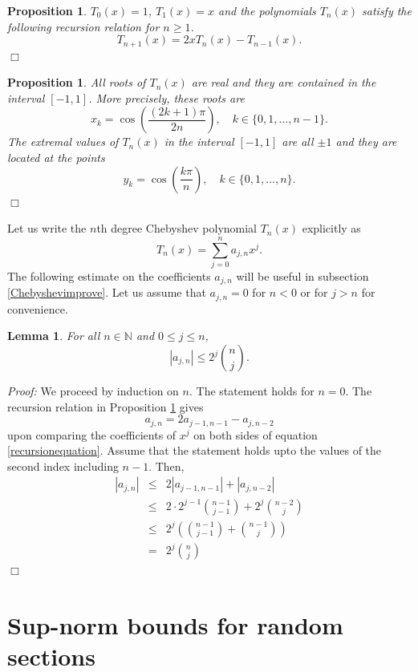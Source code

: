 \documentclass [11pt]{amsart}
\newtheorem {lemma}[theorem]{Lemma}
\newtheorem {proposition}[theorem]{Proposition}
\theoremstyle{remark}
\numberwithin{equation}{section}
\numberwithin{theorem}{section}
\begin{document}
\begin{proposition} \label{recursion} 
$T_{0}(x)=1$, $T_{1}(x)=x$ and the polynomials $T_{n}(x)$ satisfy the following recursion relation for $n\geq 1$. 
\begin{equation}\label{recursionequation}
T_{n+1}(x)=2x T_{n}(x)-T_{n-1}(x). 
\end{equation}
\hfill $\Box$ 
\end{proposition}
\begin{proposition} \label{roots}
All roots of $T_{n}(x)$ are real and  they are contained in the interval $[-1,1]$. More precisely, these roots are 
\[ x_{k}=\cos\left(\frac{(2k+1)\pi}{2n}\right), \quad k\in \{0,1,\ldots,n-1\}.  \] 
The extremal values of $T_{n}(x)$ in the interval $[-1,1]$ are all $\pm 1$ and they are located at the points
\[ y_{k}=\cos\left(\frac{k\pi}{n}\right), \quad k\in \{0,1,\ldots, n\}. \]
\hfill $\Box$ 
\end{proposition}
Let us write the $n$th degree Chebyshev polynomial $T_{n}(x)$ explicitly as 
\[ T_{n}(x)=\sum_{j=0}^{n} a_{j,n} x^j. \]
The following estimate on the coefficients $a_{j,n}$ will be useful in subsection \ref{Chebyshevimprove}. Let us assume that $a_{j,n}=0$ for $n<0$ or for $j>n$ for convenience. 

\begin{lemma} \label{coefficient}
For all $n\in \mathbb{N}$ and $0\leq j\leq n$, 
\[  |a_{j,n}| \leq 2^j  {n \choose j}.  \] 
\end{lemma} 

\noindent \textit{Proof:} We proceed by induction on $n$. The statement holds for $n=0$. The recursion relation in Proposition \ref{recursion} gives 
\[ a_{j,n}=2a_{j-1,n-1}- a_{j,n-2} \]
\noindent upon comparing the coefficients of $x^{j}$ on both sides of equation \eqref{recursionequation}. Assume that the statement holds upto the values of the second index including $n-1$. Then, 
\begin{eqnarray*} 
|a_{j,n}|&\leq& 2|a_{j-1,n-1}|+|a_{j,n-2}| \\
&\leq&2\cdot 2^{j-1} {n-1 \choose j-1} + 2^{j} {n-2 \choose j}  \\ 
&\leq&  2^{j} \left( {n-1 \choose j-1} +{n-1 \choose j}\right)  \\ 
&=& 2^{j} {n \choose j} 
\end{eqnarray*} 
\hfill $\Box$   
\section{Sup-norm bounds for random sections}
\end{document}
